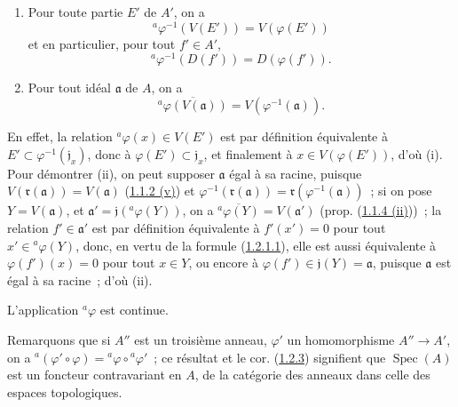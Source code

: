 \begin{proposition}[1.2.2]
\label{I.1.2.2-fr}
\begin{enumerate}
  \item[\rm(i)] Pour toute partie $E'$ de $A'$, on a
  \begin{equation}
    {}^a\varphi^{-1}(V(E'))=V(\varphi(E'))
    \tag{1.2.2.1}\label{I.1.2.2.1-fr}
  \end{equation}
  et en particulier, pour tout $f'\in A'$,
  \begin{equation}
    {}^a\varphi^{-1}(D(f'))=D(\varphi(f')).
    \tag{1.2.2.2}\label{I.1.2.2.2-fr}
  \end{equation}
  \item[\rm(ii)] Pour tout idéal $\mathfrak{a}$ de $A$, on a
  \begin{equation}
    \overline{{}^a\varphi(V(\mathfrak{a}))}
    =V(\varphi^{-1}(\mathfrak{a})).
    \tag{1.2.2.3}\label{I.1.2.2.3-fr}
  \end{equation}
\end{enumerate}
\end{proposition}

En effet, la relation ${}^a\varphi(x)\in V(E')$ est par définition
équivalente à $E'\subset\varphi^{-1}(\mathfrak{j}_x)$, donc à
$\varphi(E')\subset\mathfrak{j}_x$, et finalement à
$x\in V(\varphi(E'))$, d'où (i). Pour démontrer (ii), on peut supposer
$\mathfrak{a}$ égal à sa racine, puisque
$V(\mathfrak{r}(\mathfrak{a}))=V(\mathfrak{a})$
(\hyperref[I.1.1.2-fr]{1.1.2 (v)}) et
$\varphi^{-1}(\mathfrak{r}(\mathfrak{a}))
=\mathfrak{r}(\varphi^{-1}(\mathfrak{a}))$~; si on pose
$Y=V(\mathfrak{a})$, et
$\mathfrak{a}'=\mathfrak{j}({}^a\varphi(Y))$, on a
$\overline{{}^a\varphi(Y)}=V(\mathfrak{a}')$ (prop.
(\hyperref[I.1.1.4-fr]{1.1.4 (ii)}))~; la relation
$f'\in\mathfrak{a}'$ est par définition équivalente à $f'(x')=0$ pour tout
$x'\in{}^a\varphi(Y)$, donc, en vertu de la formule
(\hyperref[I.1.2.1.1-fr]{1.2.1.1}), elle est aussi équivalente à
$\varphi(f')(x)=0$ pour tout $x\in Y$, ou encore à
$\varphi(f')\in\mathfrak{j}(Y)=\mathfrak{a}$, puisque $\mathfrak{a}$ est
égal à sa racine~; d'où (ii).

\begin{corollary}[1.2.3]
\label{I.1.2.3-fr}
L'application ${}^a\varphi$ est continue.
\end{corollary}

Remarquons que si $A''$ est un troisième anneau, $\varphi'$ un homomorphisme
$A''\to A'$, on a
${}^a(\varphi'\circ\varphi)={}^a\varphi\circ{}^a\varphi'$~; ce résultat et le
cor. (\hyperref[I.1.2.3-fr]{1.2.3}) signifient que
$\operatorname{Spec}(A)$ est un foncteur contravariant en $A$, de la
catégorie des anneaux dans celle des espaces topologiques.

